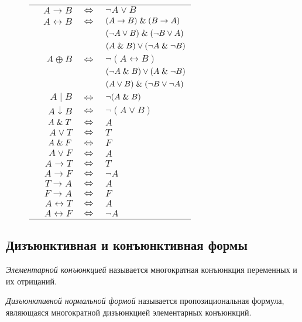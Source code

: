 \begin{figure}[!ht]
\begin{tabular}{l | r c l}
						  & $ A \to B $ & $ \iff $ & $ \neg A \vee B $ \\
						  & $ A \leftrightarrow B $ & $ \iff $ & $ (A \to B) \mathrel\& (B \to A) $ \\
						  & 		&	  & $ (\neg A \vee B) \mathrel\& (\neg B \vee A) $ \\
						  & 		&	  & $ (A \mathrel\& B) \vee (\neg A \mathrel\& \neg B) $ \\
						  & $ A \oplus B $ & $ \iff $ & $ \neg (A \leftrightarrow B) $ \\
						  &			&	  & $ (\neg A \mathrel\& B) \vee (A \mathrel\& \neg B) $ \\
						  & 		&	  & $ (A \vee B) \mathrel\& (\neg B \vee \neg A) $ \\
						  & $ A \mathrel| B $ & $ \iff $ & $ \neg(A \mathrel\& B) $ \\
						  & $ A \downarrow B $ & $ \iff $ & $ \neg (A \vee B) $ \\
						  & $ A \mathrel\& T $ & $ \iff $ & $ A $ \\
						  & $ A \vee T $ & $ \iff $ & $ T $ \\
						  & $ A \mathrel\& F $ & $ \iff $ & $ F $ \\
						  & $ A \vee F $ & $ \iff $ & $ A $ \\
						  & $ A \to T $ & $ \iff $ & $ T $ \\
						  & $ A \to F $ & $ \iff $ & $ \neg A $ \\
						  & $ T \to A $ & $ \iff $ & $ A $ \\
						  & $ F \to A $ & $ \iff $ & $ F $ \\
						  & $ A \leftrightarrow T $ & $ \iff $ & $ A $ \\
						  & $ A \leftrightarrow F $ & $ \iff $ & $ \neg A $
	\end{tabular}
\end{figure}

\subsection{Дизъюнктивная и конъюнктивная формы}

\begin{definition}
	\emph{Элементарной конъюнкцией} называется многократная конъюнкция переменных и их отрицаний.
\end{definition}

\begin{definition}
	\emph{Дизъюнктивной нормальной формой} называется пропозициональная формула, являющаяся многократной дизъюнкцией элементарных конъюнкций.
\end{definition}

